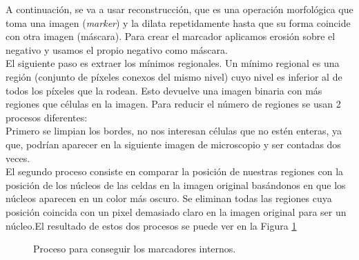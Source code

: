 \documentclass[a4paper,12pt]{report}
\begin{document}
A continuación, se va a usar reconstrucción, que es una operación morfológica que toma una imagen (\emph{marker}) y la dilata repetidamente hasta que su forma coincide con otra imagen (máscara). Para crear el marcador aplicamos erosión sobre el negativo y usamos el propio negativo como máscara.\\ 

El siguiente paso es extraer los mínimos regionales. Un mínimo regional es una región (conjunto de píxeles conexos del mismo nivel) cuyo nivel es inferior al de todos los píxeles que la rodean. Esto devuelve una imagen binaria con más regiones que células en la imagen. Para reducir el número de regiones se usan 2 procesos diferentes:\\

Primero se limpian los bordes, no nos interesan células que no estén enteras, ya que, podrían aparecer en la siguiente imagen de microscopio y ser contadas dos veces.\\

El segundo proceso consiste en comparar la posición de nuestras regiones con la posición de los núcleos de las celdas en la imagen original basándonos en que los núcleos aparecen en un color más oscuro. Se eliminan todas las regiones cuya posición coincida con un pixel demasiado claro en la imagen original para ser un núcleo.El resultado de estos dos procesos se puede ver en la Figura \ref{procesos}

\begin{figure}[!tbp]
  \centering
  \hfill
  \caption{Proceso para conseguir los marcadores internos.}
  \label{procesos}
\end{figure}
\end{document}
